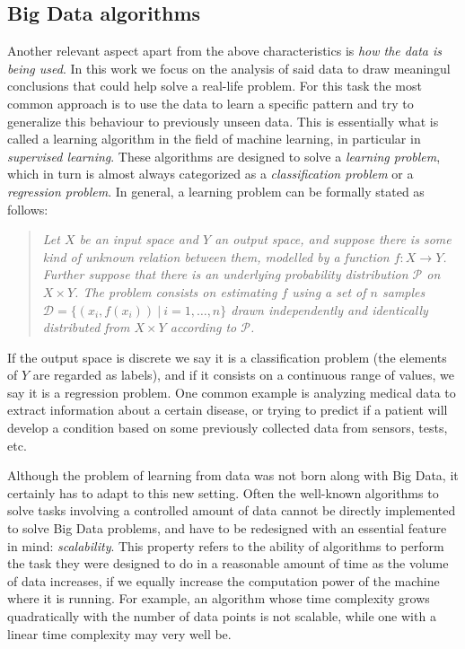 \subsection{Big Data algorithms}

Another relevant aspect apart from the above characteristics is \textit{how the data is being used}. In this work we focus on the analysis of said data to draw meaningul conclusions that could help solve a real-life problem. For this task the most common approach is to use the data to learn a specific pattern and try to generalize this behaviour to previously unseen data. This is essentially what is called a learning algorithm in the field of machine learning, in particular in \textit{supervised learning}. These algorithms are designed to solve a \textit{learning problem}, which in turn is almost always categorized as a \textit{classification problem} or a \textit{regression problem}.
In general, a learning problem can be formally stated as follows:

\begin{quotation}
  \itshape \noindent
  Let $X$ be an input space and $Y$ an output space, and suppose there is some kind of unknown relation between them, modelled by a function $f:X\to Y$. Further suppose that there is an underlying probability distribution $\mathcal P$ on $X \times Y$. The problem consists on estimating $f$ using a set of $n$ samples $\mathcal D = \{ (x_i, f(x_i)) \ | \ i = 1,\dots,n \}$ drawn independently and identically distributed from $X \times Y$ according to $\mathcal P$.
\end{quotation}
If the output space is discrete we say it is a classification problem (the elements of $Y$ are regarded as labels), and if it consists on a continuous range of values, we say it is a regression problem. One common example is analyzing medical data to extract information about a certain disease, or trying to predict if a patient will develop a condition based on some previously collected data from sensors, tests, etc.

Although the problem of learning from data was not born along with Big Data, it certainly has to adapt to this new setting. Often the well-known algorithms to solve tasks involving a controlled amount of data cannot be directly implemented to solve Big Data problems, and have to be redesigned with an essential feature in mind: \textit{scalability}. This property refers to the ability of algorithms to perform the task they were designed to do in a reasonable amount of time as the volume of data increases, if we equally increase the computation power of the machine where it is running. For example, an algorithm whose time complexity grows quadratically with the number of data points is not scalable, while one with a linear time complexity may very well be.

